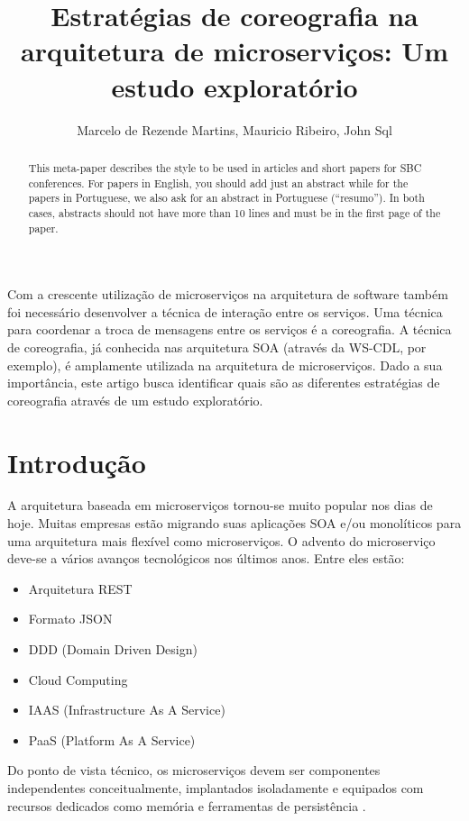 \documentclass[12pt]{article}
\title{Estratégias de coreografia na arquitetura de microserviços: Um estudo exploratório}
\author{Marcelo de Rezende Martins\inst{1}, Mauricio Ribeiro\inst{1}, John Sql\inst{1} }
\theoremstyle{plain}
\begin{document}
 

\maketitle

\begin{abstract}
  This meta-paper describes the style to be used in articles and short papers
  for SBC conferences. For papers in English, you should add just an abstract
  while for the papers in Portuguese, we also ask for an abstract in
  Portuguese (``resumo''). In both cases, abstracts should not have more than
  10 lines and must be in the first page of the paper.
\end{abstract}
     
\begin{resumo} 
  Com a crescente utilização de microserviços na arquitetura de software também foi necessário desenvolver a técnica de interação entre os serviços. Uma técnica para coordenar a troca de mensagens entre os serviços é a coreografia. A técnica de coreografia, já conhecida nas arquitetura SOA (através da WS-CDL, por exemplo), é amplamente utilizada na arquitetura de microserviços. Dado a sua importância, este artigo busca identificar quais são as diferentes estratégias de coreografia através de um estudo exploratório. 
\end{resumo}


\section{Introdução}
\label{sec:introducao}

A arquitetura baseada em microserviços tornou-se muito popular nos dias de hoje. Muitas empresas estão migrando suas aplicações SOA e/ou monolíticos para uma arquitetura mais flexível como microserviços. O advento do microserviço deve-se a vários avanços tecnológicos nos últimos anos. Entre eles estão:
\begin{itemize}
    \item Arquitetura REST
    \item Formato JSON
    \item DDD (Domain Driven Design)
    \item Cloud Computing
    \item IAAS (Infrastructure As A Service)
    \item PaaS (Platform As A Service)
\end{itemize}

Do ponto de vista técnico, os microserviços devem ser componentes independentes conceitualmente, implantados isoladamente e equipados com recursos dedicados como memória e ferramentas de persistência \cite{Dragoni2017}.
\end{document}
